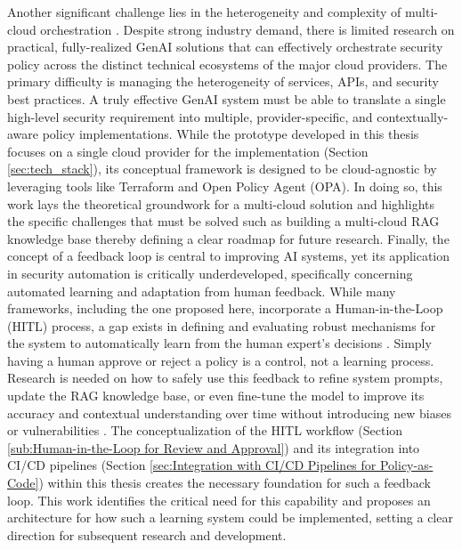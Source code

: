 Another significant challenge lies in the heterogeneity and complexity of \gls{multi-cloud} orchestration \cite{seth_ai_2025-1,bringhenti_security_2023-1}. Despite strong industry demand, there is limited research on practical, fully-realized GenAI solutions that can effectively orchestrate security policy across the distinct technical ecosystems of the major cloud providers. The primary difficulty is managing the heterogeneity of services, APIs, and security best practices. A truly effective GenAI system must be able to translate a single high-level security requirement into multiple, provider-specific, and contextually-aware policy implementations. While the prototype developed in this thesis focuses on a single cloud provider for the implementation (Section \ref{sec:tech_stack}), its conceptual framework is designed to be cloud-agnostic by leveraging tools like Terraform and Open Policy Agent (OPA). In doing so, this work lays the theoretical groundwork for a \gls{multi-cloud} solution and highlights the specific challenges that must be solved such as building a \gls{multi-cloud} RAG knowledge base thereby defining a clear roadmap for future research.
Finally, the concept of a feedback loop is central to improving AI systems, yet its application in security automation is critically underdeveloped, specifically concerning automated learning and adaptation from human feedback. While many frameworks, including the one proposed here, incorporate a Human-in-the-Loop (HITL) process, a gap exists in defining and evaluating robust mechanisms for the system to automatically learn from the human expert’s decisions \cite{nicosia_6_2024,noauthor_human---loop_nodate}. Simply having a human approve or reject a policy is a control, not a learning process. Research is needed on how to safely use this feedback to refine system prompts, update the RAG knowledge base, or even fine-tune the model to improve its accuracy and contextual understanding over time without introducing new biases or vulnerabilities \cite{tabassi_artificial_2023-1,surathunmanun_exploring_2024-1}. The conceptualization of the HITL workflow (Section \ref{sub:Human-in-the-Loop for Review and Approval}) and its integration into CI/CD pipelines (Section \ref{sec:Integration with CI/CD Pipelines for Policy-as-Code}) within this thesis creates the necessary foundation for such a feedback loop. This work identifies the critical need for this capability and proposes an architecture for how such a learning system could be implemented, setting a clear direction for subsequent research and development.

